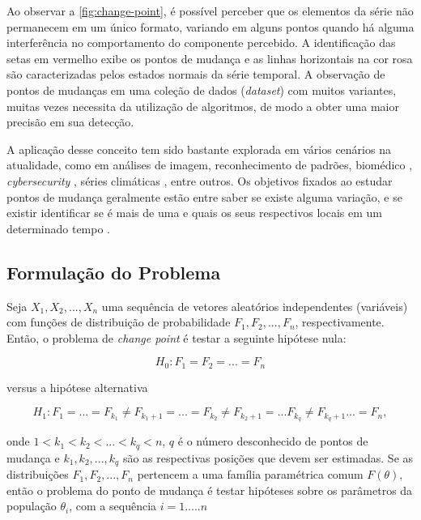 Ao observar a \autoref{fig:change-point}, é possível perceber que os elementos da série não permanecem em um único formato, variando em alguns pontos quando há alguma interferência no comportamento do componente percebido. A identificação das setas em vermelho exibe os pontos de mudança e as linhas horizontais na cor rosa são caracterizadas pelos estados normais da série temporal. A observação de pontos de mudanças em uma coleção de dados (\textit{dataset}) com muitos variantes, muitas vezes necessita da utilização de algoritmos, de modo a obter uma maior precisão em sua detecção.

A aplicação desse conceito tem sido bastante explorada em vários cenários na atualidade, como em análises de imagem, reconhecimento de padrões, biomédico \cite{Fan2015}, \textit{cybersecurity} \cite{Polunchenko2012}, séries climáticas \cite{Bates2012}, entre outros. Os objetivos fixados ao estudar pontos de mudança geralmente estão entre saber se existe alguma variação, e se existir identificar se é mais de uma e quais os seus respectivos locais em um determinado tempo \cite{Chen1-2000}.

\subsection{Formulação do Problema}

Seja $X_1, X_2, ..., X_n$ uma sequência de vetores aleatórios independentes (variáveis) com funções de distribuição de probabilidade $F_1, F_2, ..., F_n$, respectivamente. Então, o problema de \textit{change point} é testar a seguinte hipótese nula:

\begin{equation}
    H_0 : F_1 = F_2 = ... = F_n
    \label{eq:cpd-hupotese-nula-1}
\end{equation}

versus a hipótese alternativa

\begin{equation}
    H_{1} : F_{1} = ... = F_{k_1}\neq F_{{k_1}+1} = ... = F_{k_2}\neq F_{{k_2}+1} = ... F_{k_q}\neq F_{{k_q}+1} ... = F_{n},
    \label{eq:cpd-hipotese-alternativa-1}
\end{equation}

onde $1 < k_1 < k_2 < ... < k_q <n$, $q$ é o número desconhecido de pontos de mudança e $k_1, k_2, ..., k_q$ são as respectivas posições que devem ser estimadas. Se as distribuições $F_1, F_2, ..., F_n$ pertencem a uma família paramétrica comum $F(\theta)$, 
então o problema do ponto de mudança é testar hipóteses sobre os parâmetros da população $\theta_i$, com a sequência $i = 1 ..... n$

